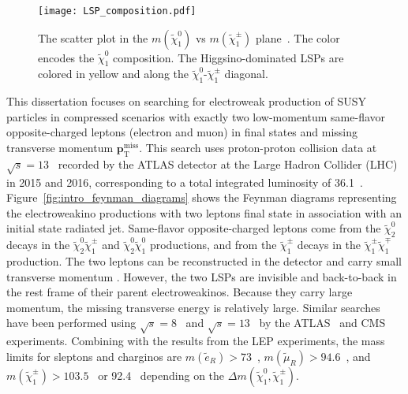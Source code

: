 \begin{figure}[htbp]
    \begin{center}
        \texttt{[image: LSP\_composition.pdf]}
        \caption{The scatter plot in the $m(\widetilde{\chi}^{0}_{1})$ vs $m(\widetilde{\chi}^{\pm}_{1})$ plane~\cite{Aaboud:2016wna}.
        The color encodes the $\widetilde{\chi}^{0}_{1}$ composition.
        The Higgsino-dominated LSPs are colored in yellow and along the $\widetilde{\chi}^{0}_{1}$-$\widetilde{\chi}^{\pm}_{1}$ diagonal.}
        \label{fig:intro_LSP_composition}
    \end{center}
\end{figure}

This dissertation focuses on searching for electroweak production of SUSY particles in compressed scenarios with exactly two low-momentum same-flavor opposite-charged leptons (electron and muon) in final states and missing transverse momentum $\textbf{p}_{\text{T}}^{\text{miss}}$.
This search uses proton-proton collision data at $\sqrt{s} = 13$~{\TeV} recorded by the ATLAS detector at the Large Hadron Collider (LHC)~\cite{Evans:2008zzb} in 2015 and 2016, corresponding to a total integrated luminosity of 36.1~\ifb.
Figure~\ref{fig:intro_feynman_diagrams} shows the Feynman diagrams representing the electroweakino productions with two leptons final state in association with an initial state radiated jet.
Same-flavor opposite-charged leptons come from the $\widetilde{\chi}^{0}_{2}$ decays in the $\widetilde{\chi}^{0}_{2} \widetilde{\chi}^{\pm}_{1}$ and $\widetilde{\chi}^{0}_{2} \widetilde{\chi}^{0}_{1}$ productions, and from the $\widetilde{\chi}^{\pm}_{1}$ decays in the $\widetilde{\chi}^{\pm}_{1} \widetilde{\chi}^{\mp}_{1}$ production.
The two leptons can be reconstructed in the detector and carry small transverse momentum  \pt.
However, the two LSPs are invisible and back-to-back in the rest frame of their parent electroweakinos.
Because they carry large momentum, the missing transverse energy \met is relatively large.
Similar searches have been performed using $\sqrt{s} = 8$~{\TeV} and $\sqrt{s} = 13$~{\TeV} by the ATLAS~\cite{Aad:2014vma, Aad:2014nua, Aad:2015eda, Aaboud:2016wna} and CMS~\cite{Khachatryan:2014qwa, Khachatryan:2015pot, Sirunyan:2017lae} experiments.
Combining with the results from the LEP experiments, the mass limits for sleptons and charginos are $m(\widetilde{e}_{R}) > 73$~{\GeV}, $m(\widetilde{\mu}_{R}) > 94.6$~{\GeV}, and $m(\widetilde{\chi}^{\pm}_{1}) > 103.5$~{\GeV} or 92.4~{\GeV} depending on the $\Delta m(\widetilde{\chi}^{0}_{1}, \widetilde{\chi}^{\pm}_{1})$.

